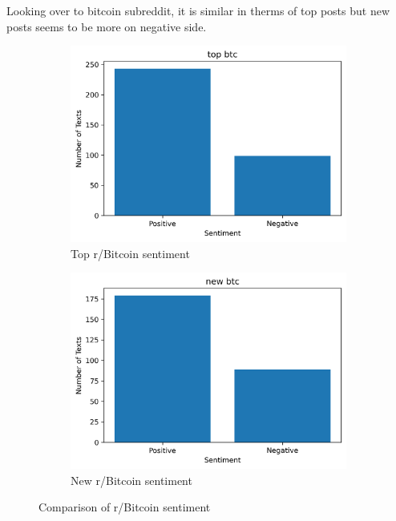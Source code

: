 Looking over to bitcoin subreddit, it is similar in therms of top posts but new posts seems to be more on negative side.
\begin{figure}[H]
  \begin{subfigure}{0.48\linewidth}
    \includegraphics[width=\linewidth]{img/B1/top_btc_sentiment.png}
    \caption{Top r/Bitcoin sentiment}
    \label{fig:top_btc_sentiment}
  \end{subfigure}
  \begin{subfigure}{0.48\linewidth}
    \includegraphics[width=\linewidth]{img/B1/new_btc_sentiment.png}
    \caption{New r/Bitcoin sentiment}
    \label{fig:new_btc_sentiment}
  \end{subfigure}
  \caption{Comparison of r/Bitcoin sentiment}
  \label{fig:btc_sentiment}
\end{figure}

